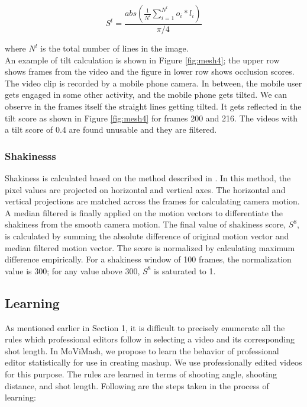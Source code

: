 \documentclass{sig-alternate}
\begin{document}
\begin{equation}
    S^t = \frac{abs (\frac{1}{N^l} \sum_{i=1}^{N^l} o_i * l_i)}{\pi/4}
\end{equation}

where $N^l$ is the total number of lines in the image.\\

An example of tilt calculation is shown in Figure \ref{fig:mesh4}; the upper
row shows frames from the video and the figure in lower row shows
occlusion scores. The video clip is recorded by a mobile phone
camera. In between, the mobile user gets engaged in some other
activity, and the mobile phone gets tilted. We can observe in the
frames itself the straight lines getting tilted. It gets reflected in the
tilt score as shown in Figure \ref{fig:mesh4} for frames 200 and 216. The videos
with a tilt score of 0.4 are found unusable and they are filtered.

\subsubsection{Shakinesss}
Shakiness is calculated based on the method described in \cite{4}.
In this method, the pixel values are projected on horizontal and
vertical axes. The horizontal and vertical projections are matched
across the frames for calculating camera motion. A median filtered
is finally applied on the motion vectors to differentiate the shakiness from the smooth camera motion. The final value of shakiness
score, $S^8$, is calculated by summing the absolute difference of original motion vector and median filtered motion vector. The score is
normalized by calculating maximum difference empirically. For a
shakiness window of 100 frames, the normalization value is 300;
for any value above 300, $S^8$ is saturated to 1.

\subsection{Learning}
As mentioned earlier in Section 1, it is difficult to precisely enumerate all the rules which professional editors follow in selecting
a video and its corresponding shot length. In MoViMash, we propose to learn the behavior of professional editor statistically for use
in creating mashup. We use professionally edited videos for this
purpose. The rules are learned in terms of shooting angle, shooting distance, and shot length. Following are the steps taken in the process of learning:
\end{document}
